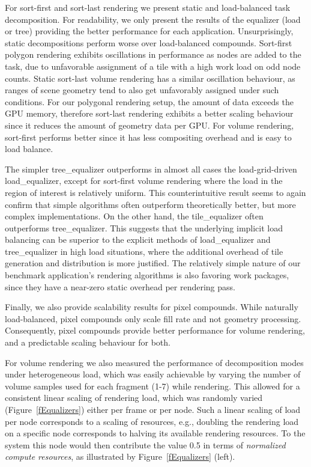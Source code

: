 \documentclass[10pt,journal,compsoc]{IEEEtran}
\newcommand{\fig}[1]{Figure~\ref{#1}}
\providecommand{\DIFaddtex}[1]{{\protect\color{blue} \sf #1}} %
\providecommand{\DIFaddbegin}{} %
\providecommand{\DIFaddend}{} %
\providecommand{\DIFadd}[1]{\texorpdfstring{\DIFaddtex{#1}}{#1}} %
\newcommand{\DIFaddincludegraphics}[2][]{{\color{blue}\fbox{\DIFOincludegraphics[#1]{#2}}}} %
\DeclareRobustCommand{\DIFaddbegin}{\DIFOaddbegin \let\includegraphics\DIFaddincludegraphics} %
\DeclareRobustCommand{\DIFaddend}{\DIFOaddend \let\includegraphics\DIFOincludegraphics} %
\begin{document}
For sort-first and sort-last rendering we present static and load-balanced task
decomposition. For readability, we only present the results of the equalizer
(load or tree) providing the better performance for each application.
Unsurprisingly, static decompositions perform worse over load-balanced
compounds. Sort-first polygon rendering exhibits oscillations in performance as
nodes are added to the task, due to unfavorable assignment of a tile with a
high work load on odd node counts. Static sort-last volume rendering has a
similar oscillation behaviour, as ranges of scene geometry tend to also get
unfavorably assigned under such conditions. \DIFaddbegin \DIFadd{For our polygonal rendering setup,
the amount of data exceeds the GPU memory, therefore sort-last rendering
exhibits a better scaling behaviour since it reduces the amount of geometry
data per GPU. For volume rendering, sort-first performs better since it has
less compositing overhead and is easy to load balance.
}\DIFaddend 

The simpler \textsf{tree\_equalizer} outperforms in almost all cases the
load-grid-driven \textsf{load\_equalizer}, except for sort-first volume
rendering where the load in the region of interest is relatively uniform. This
counterintuitive result seems to again confirm that simple algorithms often
outperform theoretically better, but more complex implementations. On the other
hand, the \textsf{tile\_equalizer} often outperforms \textsf{tree\_equalizer}.
This suggests that the underlying implicit load balancing can be superior to the
explicit methods of \textsf{load\_equalizer} and \textsf{tree\_equalizer} in
high load situations, where the additional overhead of tile generation and
distribution is more justified. The relatively simple nature of our benchmark
application's rendering algorithms is also favoring work packages, since they
have a near-zero static overhead per rendering pass.

Finally, we also provide scalability results for pixel compounds. While
naturally load-balanced, pixel compounds only scale fill rate and not geometry
processing. Consequently, pixel compounds provide better performance for volume
rendering, and a predictable scaling behaviour for both.

For volume rendering we also measured the performance of decomposition modes
under heterogeneous load, which was easily achievable by varying the number of
volume samples used for each fragment (1-7) while rendering. This allowed for a
consistent linear scaling of rendering load, which was randomly varied
(\fig{fEqualizers}) either per frame or per node. Such a linear scaling of load
per node corresponds to a scaling of resources, e.g., doubling the rendering
load on a specific node corresponds to halving its available rendering
resources. To the system this node would then contribute the value 0.5 in terms
of {\em normalized compute resources}, as illustrated by \fig{fEqualizers}
(left).
\end{document}
